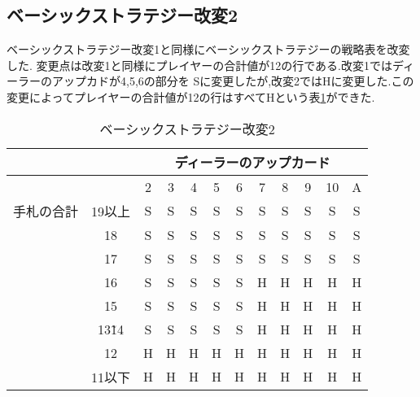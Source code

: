 \subsection{ベーシックストラテジー改変2}
ベーシックストラテジー改変1と同様にベーシックストラテジーの戦略表を改変した.
変更点は改変1と同様にプレイヤーの合計値が12の行である.改変1ではディーラーのアップカドが4,5,6の部分を
Sに変更したが,改変2ではHに変更した.この変更によってプレイヤーの合計値が12の行はすべてHという表\ref{bschange2}ができた.

\begin{table}[htbp]
  \centering
  \caption{ベーシックストラテジー改変2\label{bschange2}}
  \begin{tabular}{|c|c|c|c|c|c|c|c|c|c|c|c|}
    \hline
    \multicolumn{2}{|c|}{} & \multicolumn{10}{|c|}{ディーラーのアップカード} \\ \hline
    \multicolumn{2}{|c|}{} & 2 & 3 & 4 & 5 & 6 & 7 & 8 & 9 & 10 & A \\ \hline
    手札の合計 & 19以上 & S & S & S & S & S & S & S & S & S & S \\ \cline{3-12}
              & 18 & S & S & S & S & S & S & S & S & S & S \\ \cline{3-12}
              & 17 & S & S & S & S & S & S & S & S & S & S \\ \cline{3-12}
              & 16 & S & S & S & S & S & H & H & H & H & H \\ \cline{3-12}
              & 15 & S & S & S & S & S & H & H & H & H & H \\ \cline{3-12}
              & 13\~ 14 & S & S & S & S & S & H & H & H & H & H \\ \cline{3-12}
              & 12 & H & H & H & H & H & H & H & H & H & H \\ \cline{3-12}
              & 11以下 & H & H & H & H & H & H & H & H & H & H \\ \hline
  \end{tabular}
\end{table}

